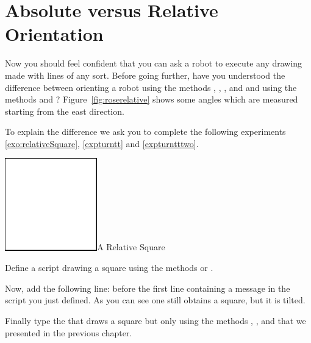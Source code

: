 \section{Absolute versus Relative Orientation}
Now you should feel confident that you can ask a robot to execute any
drawing made with lines of any sort. Before going further, have you
understood the difference between orienting a robot using the
methods \north, \south, \east, and \west and using the methods \turnLeft and \turnRight?
Figure~\ref{fig:roserelative} shows some angles which are measured starting from the east direction. 

To explain the difference we ask you to complete the following experiments \ref{exo:relativeSquare}, \ref{expturntt} and \ref{expturntttwo}.

\begin{exofigwithsizeandtitle}[0.4]{\includegraphics[width=4cm]{ChTurnfirstSquare}}{A Relative Square} \label{exo:relativeSquare} 


Define a script drawing a square using the methods \turnLeft or \turnRight.
\end{exofigwithsizeandtitle}

\begin{exonofig}\label{expturntt}
Now, add the following line:   before the first
line containing a \go message in the script you just defined.  As you can see one still obtains a square, but it is tilted. 
\end{exonofig}

\begin{exonofig}\label{expturntttwo}
Finally type the  that draws a square but only using the methods \north, \south, \east and \west that we presented in the previous chapter. 
\end{exonofig}

